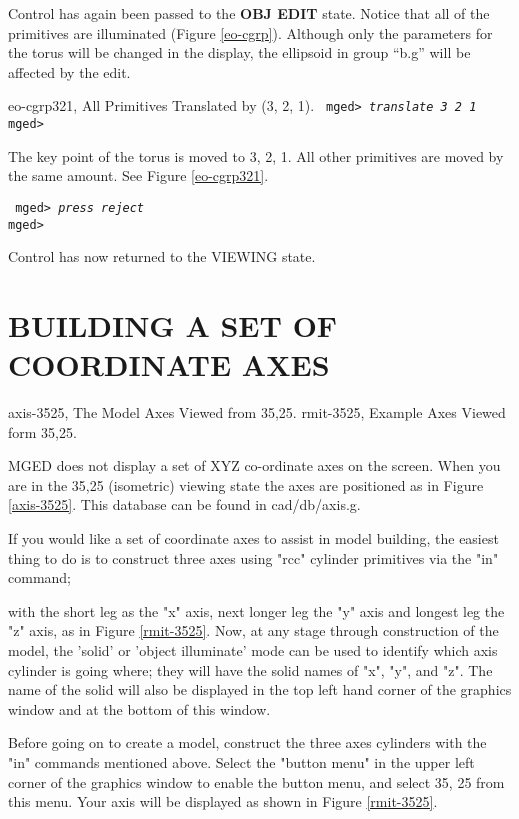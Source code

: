 Control has again been passed to the {\bf OBJ EDIT} state. Notice that
all of the primitives are illuminated (Figure \ref{eo-cgrp}).
Although only the parameters for the torus will be changed in the
display, the ellipsoid in group ``b.g'' will be affected by the edit.

\mfig eo-cgrp321, All Primitives Translated by (3, 2, 1).
\noindent
{\tt
mged> {\em translate 3 2 1}\\
mged>\\
}

The key point of the torus is moved to 3, 2, 1. All other primitives are
moved by the same amount.  See Figure \ref{eo-cgrp321}.

\noindent
{\tt
mged> {\em press reject}\\
mged>\\
}

Control has now returned to the VIEWING state.
\chapter{BUILDING A SET OF COORDINATE AXES}
\mfig axis-3525, The Model Axes Viewed from 35,25.
\mfig rmit-3525, Example Axes Viewed form 35,25.

MGED does not display a set of XYZ co-ordinate axes on the
screen.
When you are in the 35,25 (isometric) viewing state the axes are
positioned as in Figure \ref{axis-3525}.
This database can be found in cad/db/axis.g.

If you would like a set of coordinate axes to assist in model building,
the easiest thing to do is to
construct three axes using "rcc" cylinder primitives via the "in" command;


with the short leg as the "x" axis, next longer leg the "y" axis and longest
leg the "z" axis,
as in Figure \ref{rmit-3525}.
Now, at any stage through construction of the model,
the 'solid' or 'object illuminate' mode can be used
to identify which axis cylinder is going where; they
will have the solid names of "x", "y", and "z".
The name of the solid will also be
displayed in the top left hand corner of the graphics window
and at the bottom of this window.

Before going on to create a model, construct the three axes cylinders
with the "in" commands mentioned above.
Select the "button menu" in the
upper left corner of the graphics window
to enable the button menu, and
select 35, 25 from this menu.
Your axis will be displayed as shown in Figure \ref{rmit-3525}.

